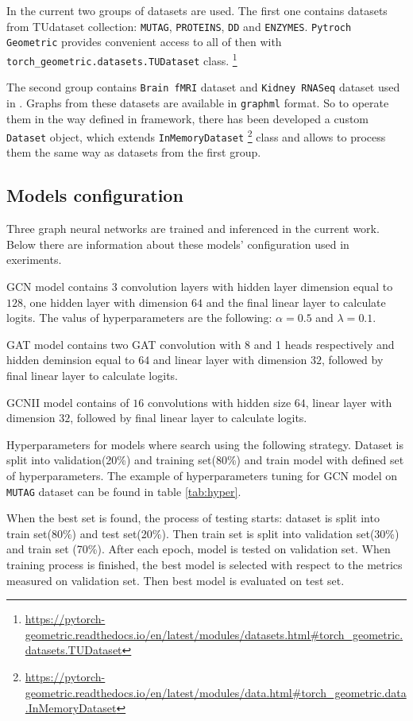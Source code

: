 In the current two groups of datasets are used. The first one contains datasets from TUdataset\cite{TUDataset}
collection: \texttt{MUTAG}, \texttt{PROTEINS}, \texttt{DD} and \texttt{ENZYMES}. \texttt{Pytroch Geometric}
 provides convenient access to all of then with \texttt{torch\_geometric.datasets.TUDataset} class.
\footnote{\url{https://pytorch-geometric.readthedocs.io/en/latest/modules/datasets.html\#torch_geometric.datasets.TUDataset}}

The second group contains \texttt{Brain fMRI} dataset and \texttt{Kidney RNASeq} dataset used in \cite{Netpro2vec}. Graphs from
these datasets are available in \texttt{graphml} format. So to operate them in the way
defined in framework, there has been developed a custom \texttt{Dataset} object, which
extends \texttt{InMemoryDataset} \footnote{\url{https://pytorch-geometric.readthedocs.io/en/latest/modules/data.html\#torch_geometric.data.InMemoryDataset}}
class and allows to process them the same way as datasets from the first group.

\subsection{Models configuration}

Three graph neural networks are trained and inferenced in the current work. Below there are information
about these models' configuration used in exeriments.

GCN model contains 3 convolution layers with hidden layer dimension equal to $128$,
one hidden layer with dimension $64$ and the final linear layer to calculate logits.
The valus of hyperparameters are the following: $\alpha=0.5$ and $\lambda=0.1$.

GAT model contains two GAT convolution with 8 and 1 heads respectively and hidden deminsion equal to $64$
and linear layer with dimension $32$, followed by  final linear layer to calculate logits.

GCNII model contains of $16$ convolutions with hidden size $64$,  linear layer with dimension $32$,
followed by  final linear layer to calculate logits.

Hyperparameters for models where search using the following strategy.
Dataset is split into validation(20\%) and training set(80\%) and train model
with defined set of hyperparameters. The example of hyperparameters tuning 
for GCN model on \texttt{MUTAG} dataset can be found in table \ref{tab:hyper}.

When the best set is found, 
the process of testing starts: dataset is split into train set(80\%) and 
test set(20\%). Then train set is split into validation set(30\%) and train set (70\%).
After each epoch, model is tested on validation set. When training process is finished,
the best model is selected with respect to the metrics measured on validation set.
Then best model is evaluated on test set.


